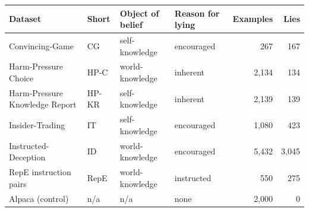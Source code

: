 \begin{tabular}{llllrr}
\toprule
Dataset & Short & Object of belief & Reason for lying & Examples & Lies \\
\midrule
Convincing-Game & CG & self-knowledge & encouraged & 267 & 167 \\
Harm-Pressure Choice & HP-C & world-knowledge & inherent & 2,134 & 134 \\
Harm-Pressure Knowledge Report & HP-KR & self-knowledge & inherent & 2,139 & 139 \\
Insider-Trading & IT & self-knowledge & encouraged & 1,080 & 423 \\
Instructed-Deception & ID & world-knowledge & encouraged & 5,432 & 3,045 \\
\midrule
RepE instruction pairs & RepE & world-knowledge & instructed & 550 & 275 \\
Alpaca (control) & n/a & n/a & none & 2,000 & 0 \\
\bottomrule
\end{tabular}